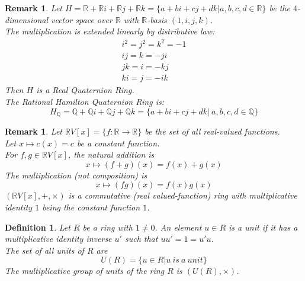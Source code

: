 \documentclass[a4paper,8pt]{article}
\newcommand{\hlt}[1]{\textit{{\color{blue}#1}}}
\theoremstyle{theorem}
\newtheorem{definition}[theorem]{Definition}
\newtheorem{remark}[theorem]{Remark}
\begin{document}
\begin{remark}
Let $H=\mathbb{R} + \mathbb{R} i + \mathbb{R} j + \mathbb{R} k = \{a+bi+cj+dk|a,b,c,d \in \mathbb{R}\}$ be the $4$-dimensional vector space over $\mathbb{R}$ with $\mathbb{R}$-basis $(1, i, j, k)$.\\
The multiplication is extended linearly by distributive law: 
\begin{align}
i^2 = j^2 = k^2 = -1 \nonumber \\
ij=k=-ji \nonumber \\
jk=i=-kj \nonumber \\
ki=j=-ik \nonumber
\end{align}
Then $H$ is a \hlt{Real Quaternion Ring}.\\
The \hlt{Rational Hamilton Quaternion Ring} is:
\begin{equation}
H_\mathbb{Q}=\mathbb{Q}+\mathbb{Q}i+\mathbb{Q}j+\mathbb{Q}k=\{a+bi+cj+dk|\ a, b, c, d\in \mathbb{Q}\} \nonumber
\end{equation}
\end{remark}


\begin{remark}
Let $\mathbb{R}V[x]=\{f:\mathbb{R}\rightarrow\mathbb{R}\}$ be the set of all real-valued functions.\\
Let $x\mapsto c(x) = c$ be a constant function.\\
For $f, g \in \mathbb{R}V[x]$, the natural addition is
\begin{equation}
x\mapsto (f+g)(x) = f(x)+g(x) \nonumber
\end{equation}
The multiplication (not composition) is 
\begin{equation}
x\mapsto (fg)(x)=f(x)g(x) \nonumber
\end{equation}
$(\mathbb{R}V[x], +, \times)$ is a commutative \hlt{(real valued-function) ring} with multiplicative identity $1$ being the constant function $1$.\\
\end{remark}


\begin{definition}
Let $R$ be a ring with $1 \neq 0$. An element $u \in R$ is a \hlt{unit} if it has a multiplicative identity inverse $u'$ such that $uu'=1=u'u$.\\
The \hlt{set of all units} of $R$ are 
\begin{equation}
U(R)=\{u\in R | u \ is \ a \ unit\} \nonumber
\end{equation}
The \hlt{multiplicative group of units of the ring} $R$ is $(U(R), \times)$.\\
\end{definition}
\end{document}
